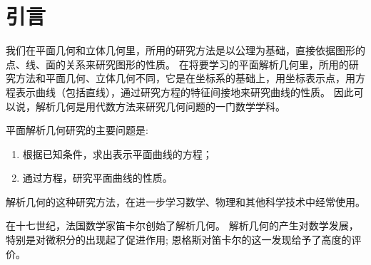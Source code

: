\chapter{引言}
我们在平面几何和立体几何里，所用的研究方法是以公理为基础，直接依据图形的点、线、面的关系来研究图形的性质。
在将要学习的平面解析几何里，所用的研究方法和平面几何、立体几何不同，它是在坐标系的基础上，用坐标表示点，用方程表示曲线（包括直线），通过研究方程的特征间接地来研究曲线的性质。
因此可以说，解析几何是用代数方法来研究几何问题的一门数学学科。

平面解析几何研究的主要问题是:
\begin{enumerate}
  \item 根据已知条件，求出表示平面曲线的方程；
  \item 通过方程，研究平面曲线的性质。
\end{enumerate}

解析几何的这种研究方法，在进一步学习数学、物理和其他科学技术中经常使用。

在十七世纪，法国数学家笛卡尔创始了解析几何。
解析几何的产生对数学发展，特别是对微积分的出现起了促进作用; 恩格斯对笛卡尔的这一发现给予了高度的评价。